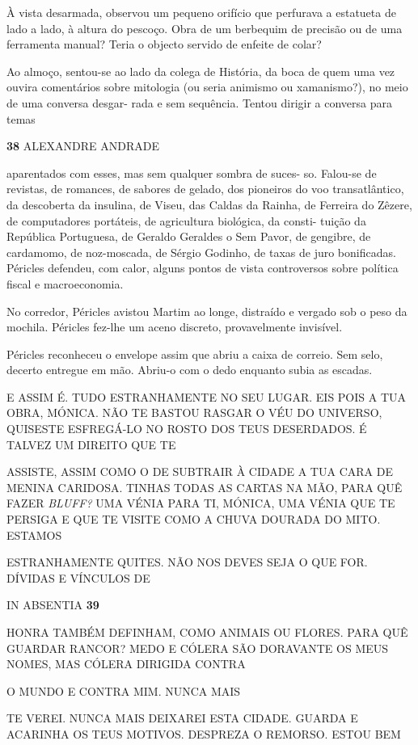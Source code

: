 À vista desarmada, observou um pequeno orifício que perfurava a
estatueta de lado a lado, à altura do pescoço. Obra de um berbequim de
precisão ou de uma ferramenta manual? Teria o objecto servido de enfeite
de colar?

Ao almoço, sentou-se ao lado da colega de História, da boca de quem uma
vez ouvira comentários sobre mitologia (ou seria animismo ou
xamanismo?), no meio de uma conversa desgar- rada e sem sequência.
Tentou dirigir a conversa para temas

\textbf{38 }ALEXANDRE ANDRADE

aparentados com esses, mas sem qualquer sombra de suces- so. Falou-se de
revistas, de romances, de sabores de gelado, dos pioneiros do voo
transatlântico, da descoberta da insulina, de Viseu, das Caldas da
Rainha, de Ferreira do Zêzere, de computadores portáteis, de agricultura
biológica, da consti- tuição da República Portuguesa, de Geraldo
Geraldes o Sem Pavor, de gengibre, de cardamomo, de noz-moscada, de
Sérgio Godinho, de taxas de juro bonificadas. Péricles defendeu, com
calor, alguns pontos de vista controversos sobre política fiscal e
macroeconomia.

No corredor, Péricles avistou Martim ao longe, distraído e vergado sob o
peso da mochila. Péricles fez-lhe um aceno discreto, provavelmente
invisível.

Péricles reconheceu o envelope assim que abriu a caixa de correio. Sem
selo, decerto entregue em mão. Abriu-o com o dedo enquanto subia as
escadas.

E ASSIM É. TUDO ESTRANHAMENTE NO SEU LUGAR. EIS POIS A TUA OBRA, MÓNICA.
NÃO TE BASTOU RASGAR O VÉU DO UNIVERSO, QUISESTE ESFREGÁ-LO NO ROSTO DOS
TEUS DESERDADOS. É TALVEZ UM DIREITO QUE TE

ASSISTE, ASSIM COMO O DE SUBTRAIR À CIDADE A TUA CARA DE MENINA
CARIDOSA. TINHAS TODAS AS CARTAS NA MÃO, PARA QUÊ FAZER \emph{BLUFF?
}UMA VÉNIA PARA TI, MÓNICA, UMA VÉNIA QUE TE PERSIGA E QUE TE VISITE
COMO A CHUVA DOURADA DO MITO. ESTAMOS

ESTRANHAMENTE QUITES. NÃO NOS DEVES SEJA O QUE FOR. DÍVIDAS E VÍNCULOS
DE

IN ABSENTIA \textbf{39}

HONRA TAMBÉM DEFINHAM, COMO ANIMAIS OU FLORES. PARA QUÊ GUARDAR RANCOR?
MEDO E CÓLERA SÃO DORAVANTE OS MEUS NOMES, MAS CÓLERA DIRIGIDA CONTRA

O MUNDO E CONTRA MIM. NUNCA MAIS

TE VEREI. NUNCA MAIS DEIXAREI ESTA CIDADE. GUARDA E ACARINHA OS TEUS
MOTIVOS. DESPREZA O REMORSO. ESTOU BEM

